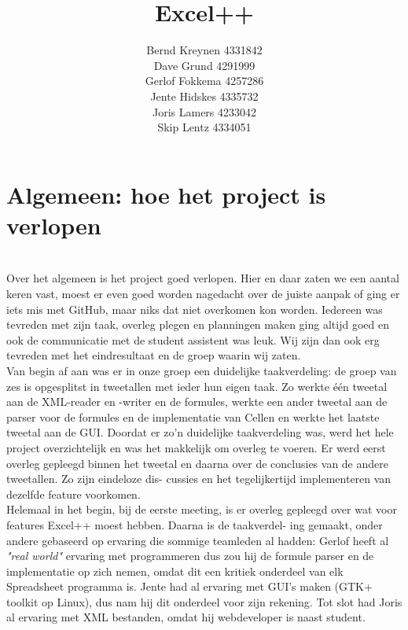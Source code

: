 \documentclass[a4paper,11pt]{article}
\title{Excel++}
\author{Bernd Kreynen 4331842\\
		Dave Grund 4291999\\
		Gerlof Fokkema 4257286\\
		Jente Hidskes 4335732\\
		Joris Lamers 4233042\\
		Skip Lentz 4334051\\
	   }
\begin{document}
\begin{titlepage}
\maketitle
\thispagestyle{empty} %
\end{titlepage}

\newpage\section{Algemeen: hoe het project is verlopen}\mbox{} \\
Over het algemeen is het project goed verlopen. Hier en daar zaten we
een aantal keren vast, moest er even goed worden nagedacht over de juiste
aanpak of ging er iets mis met GitHub, maar niks dat niet overkomen kon
worden. Iedereen was tevreden met zijn taak, overleg plegen en planningen
maken ging altijd goed en ook de communicatie met de student assistent
was leuk. Wij zijn dan ook erg tevreden met het eindresultaat en de groep
waarin wij zaten.\\

Van begin af aan was er in onze groep een duidelijke taakverdeling: de
groep van zes is opgesplitst in tweetallen met ieder hun eigen taak. Zo
werkte één tweetal aan de XML-reader en -writer en de formules, werkte
een ander tweetal aan de parser voor de formules en de implementatie van
Cellen en werkte het laatste tweetal aan de GUI. Doordat er zo’n duidelijke
taakverdeling was, werd het hele project overzichtelijk en was het makkelijk
om overleg te voeren. Er werd eerst overleg gepleegd binnen het tweetal en
daarna over de conclusies van de andere tweetallen. Zo zijn eindeloze dis-
cussies en het tegelijkertijd implementeren van dezelfde feature voorkomen.\\

Helemaal in het begin, bij de eerste meeting, is er overleg gepleegd
over wat voor features Excel++ moest hebben. Daarna is de taakverdel-
ing gemaakt, onder andere gebaseerd op ervaring die sommige teamleden al
hadden: Gerlof heeft al \textit{"real world"} ervaring met programmeren dus zou
hij de formule parser en de implementatie op zich nemen, omdat dit een
kritiek onderdeel van elk Spreadsheet programma is. Jente had al ervaring
met GUI’s maken (GTK+ toolkit op Linux), dus nam hij dit onderdeel voor
zijn rekening. Tot slot had Joris al ervaring met XML bestanden, omdat hij
webdeveloper is naast student.\\
\end{document}
